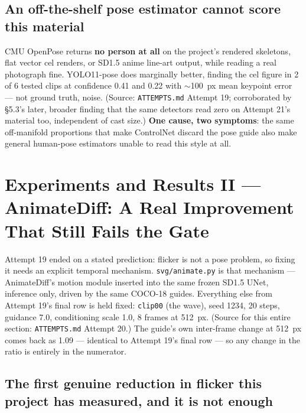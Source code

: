 \documentclass[11pt]{article}
\newcommand{\secsym}{\S}
\begin{document}
\subsection{An off-the-shelf pose estimator cannot score this material}
\label{sec:poseestimator}

CMU OpenPose returns \textbf{no person at all} on the project's rendered
skeletons, flat vector cel renders, or SD1.5 anime line-art output, while
reading a real photograph fine. YOLO11-pose does marginally better,
finding the cel figure in 2 of 6 tested clips at confidence 0.41 and 0.22
with $\sim$100~px mean keypoint error --- not ground truth, noise.
(Source: \texttt{ATTEMPTS.md} Attempt 19; corroborated by \secsym5.3's
later, broader finding that the same detectors read zero on Attempt 21's
material too, independent of cast size.) \textbf{One cause, two
symptoms}: the same off-manifold proportions that make ControlNet discard
the pose guide also make general human-pose estimators unable to read
this style at all.

\section{Experiments and Results II --- AnimateDiff: A Real Improvement That Still Fails the Gate}
\label{sec:results2}

Attempt 19 ended on a stated prediction: flicker is not a pose problem, so
fixing it needs an explicit temporal mechanism. \texttt{svg/animate.py} is
that mechanism --- AnimateDiff's motion module inserted into the same
frozen SD1.5 UNet, inference only, driven by the same COCO-18 guides.
Everything else from Attempt 19's final row is held fixed: \texttt{clip00}
(the wave), seed 1234, 20 steps, guidance 7.0, conditioning scale 1.0, 8
frames at 512~px. (Source for this entire section: \texttt{ATTEMPTS.md}
Attempt 20.) The guide's own inter-frame change at 512~px comes back as
1.09 --- identical to Attempt 19's final row --- so any change in the
ratio is entirely in the numerator.

\subsection{The first genuine reduction in flicker this project has measured, and it is not enough}
\label{sec:firstreduction}
\end{document}
